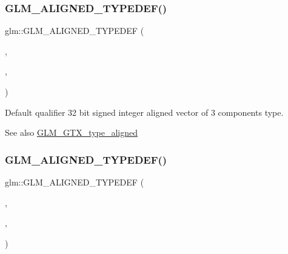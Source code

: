 \subsubsection{\texorpdfstring{G\+L\+M\+\_\+\+A\+L\+I\+G\+N\+E\+D\+\_\+\+T\+Y\+P\+E\+D\+E\+F()}{GLM\_ALIGNED\_TYPEDEF()}\hspace{0.1cm}{\footnotesize\ttfamily [63/209]}}
{\footnotesize\ttfamily glm\+::\+G\+L\+M\+\_\+\+A\+L\+I\+G\+N\+E\+D\+\_\+\+T\+Y\+P\+E\+D\+EF (\begin{DoxyParamCaption}\item[{\mbox{\hyperlink{group__gtc__type__precision_ga9811a4ec26e517ea85c785d3f3f4baac}{i32vec3}}}]{,  }\item[{aligned\+\_\+i32vec3}]{,  }\item[{16}]{ }\end{DoxyParamCaption})}

Default qualifier 32 bit signed integer aligned vector of 3 components type. \begin{DoxySeeAlso}{See also}
\mbox{\hyperlink{group__gtx__type__aligned}{G\+L\+M\+\_\+\+G\+T\+X\+\_\+type\+\_\+aligned}} 
\end{DoxySeeAlso}
\mbox{\label{group__gtx__type__aligned_gad2ecbdea18732163e2636e27b37981ee}} 
\subsubsection{\texorpdfstring{G\+L\+M\+\_\+\+A\+L\+I\+G\+N\+E\+D\+\_\+\+T\+Y\+P\+E\+D\+E\+F()}{GLM\_ALIGNED\_TYPEDEF()}\hspace{0.1cm}{\footnotesize\ttfamily [64/209]}}
{\footnotesize\ttfamily glm\+::\+G\+L\+M\+\_\+\+A\+L\+I\+G\+N\+E\+D\+\_\+\+T\+Y\+P\+E\+D\+EF (\begin{DoxyParamCaption}\item[{\mbox{\hyperlink{group__gtc__type__precision_ga78c16dde5527264e8085b375efba6f28}{i32vec4}}}]{,  }\item[{aligned\+\_\+i32vec4}]{,  }\item[{16}]{ }\end{DoxyParamCaption})}


